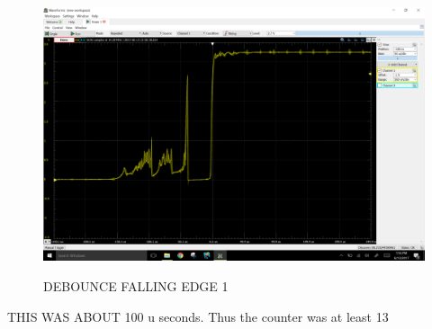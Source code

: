 \documentclass[11pt]{article}
\theoremstyle{plain}
\theoremstyle{definition}
\begin{document}
\begin{figure}[H]
	\centering
	\includegraphics[width=\textwidth]{3d}
	\label{fig:c}
	\caption{DEBOUNCE FALLING EDGE 1}
\end{figure}

THIS WAS ABOUT 100 u seconds. Thus the counter was at least 13
\end{document}
